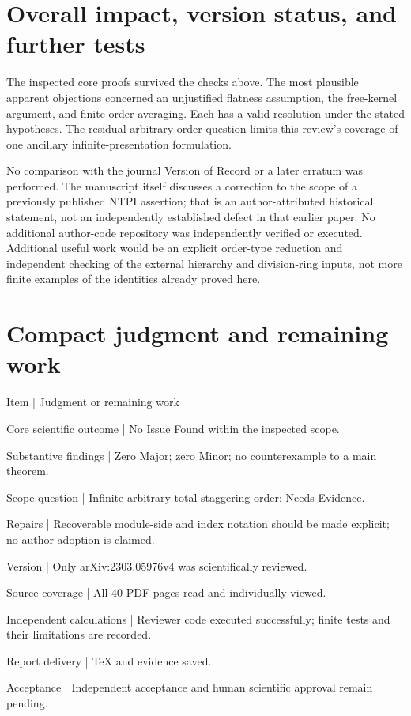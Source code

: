 \documentclass[10pt]{article}
\begin{document}
\section*{Overall impact, version status, and further tests}
The inspected core proofs survived the checks above. The most plausible apparent objections concerned an unjustified flatness assumption, the free-kernel argument, and finite-order averaging. Each has a valid resolution under the stated hypotheses. The residual arbitrary-order question limits this review’s coverage of one ancillary infinite-presentation formulation.\par
No comparison with the journal Version of Record or a later erratum was performed. The manuscript itself discusses a correction to the scope of a previously published NTPI assertion; that is an author-attributed historical statement, not an independently established defect in that earlier paper. No additional author-code repository was independently verified or executed. Additional useful work would be an explicit order-type reduction and independent checking of the external hierarchy and division-ring inputs, not more finite examples of the identities already proved here.\par
\section*{Compact judgment and remaining work}
Item | Judgment or remaining work\par
Core scientific outcome | No Issue Found within the inspected scope.\par
Substantive findings | Zero Major; zero Minor; no counterexample to a main theorem.\par
Scope question | Infinite arbitrary total staggering order: Needs Evidence.\par
Repairs | Recoverable module-side and index notation should be made explicit; no author adoption is claimed.\par
Version | Only arXiv:2303.05976v4 was scientifically reviewed.\par
Source coverage | All 40 PDF pages read and individually viewed.\par
Independent calculations | Reviewer code executed successfully; finite tests and their limitations are recorded.\par
Report delivery | TeX and evidence saved.\par
Acceptance | Independent acceptance and human scientific approval remain pending.\par
\end{document}
